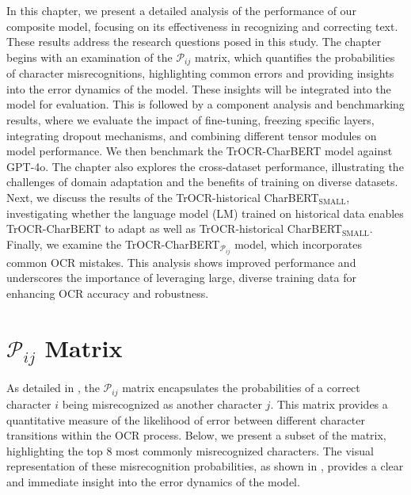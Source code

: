 
\label{chap:5_results_and_discussion}
In this chapter, we present a detailed analysis of the performance of our composite model, focusing on its effectiveness in recognizing and correcting text. These results address the research questions posed in this study. The chapter begins with an examination of the $\mathcal{P}_{ij}$ matrix, which quantifies the probabilities of character misrecognitions, highlighting common errors and providing insights into the error dynamics of the model. These insights will be integrated into the model for evaluation. This is followed by a component analysis and benchmarking results, where we evaluate the impact of fine-tuning, freezing specific layers, integrating dropout mechanisms, and combining different tensor modules on model performance. We then benchmark the TrOCR-CharBERT model against GPT-4o. The chapter also explores the cross-dataset performance, illustrating the challenges of domain adaptation and the benefits of training on diverse datasets. Next, we discuss the results of the TrOCR-historical CharBERT$_{\text{SMALL}}$, investigating whether the language model (LM) trained on historical data enables TrOCR-CharBERT to adapt as well as TrOCR-historical CharBERT$_{\text{SMALL}}$. Finally, we examine the TrOCR-CharBERT$_{\mathcal{P}_{ij}}$ model, which incorporates common OCR mistakes. This analysis shows improved performance and underscores the importance of leveraging large, diverse training data for enhancing OCR accuracy and robustness.
\section{$\mathcal{P}_{ij}$ Matrix}
\label{sec:5_pij_matrix}
As detailed in , the $\mathcal{P}_{ij}$ matrix encapsulates the probabilities of a correct character $i$ being misrecognized as another character $j$. This matrix provides a quantitative measure of the likelihood of error between different character transitions within the OCR process. Below, we present a subset of the matrix, highlighting the top 8 most commonly misrecognized characters. The visual representation of these misrecognition probabilities, as shown in , provides a clear and immediate insight into the error dynamics of the model. 

